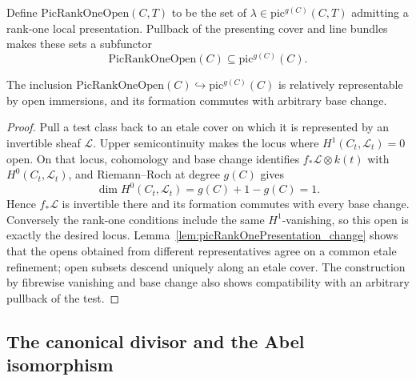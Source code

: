 \begin{definition}
  \label{def:picRankOneOpen}
  \notready
  Define \(\mathrm{PicRankOneOpen}(C,T)\) to be the set of
  \(\lambda\in\mathrm{pic}^{g(C)}(C,T)\) admitting a rank-one local presentation.
  Pullback of the presenting cover and line bundles makes these sets a subfunctor
  \[
    \mathrm{PicRankOneOpen}(C)\subseteq\mathrm{pic}^{g(C)}(C).
  \]
\end{definition}

\begin{theorem}
  \label{thm:picRankOneOpen_isOpen}
  \notready
  The inclusion
  \(\mathrm{PicRankOneOpen}(C)\hookrightarrow\mathrm{pic}^{g(C)}(C)\) is relatively
  representable by open immersions, and its formation commutes with arbitrary base change.
\end{theorem}
\begin{proof}
  Pull a test class back to an etale cover on which it is represented by an invertible sheaf
  \(\mathcal L\).  Upper semicontinuity makes the locus where
  \(H^1(C_t,\mathcal L_t)=0\) open.  On that locus, cohomology and base change identifies
  \(f_*\mathcal L\otimes k(t)\) with \(H^0(C_t,\mathcal L_t)\), and Riemann--Roch at degree
  \(g(C)\) gives
  \[
    \dim H^0(C_t,\mathcal L_t)=g(C)+1-g(C)=1.
  \]
  Hence \(f_*\mathcal L\) is invertible there and its formation commutes with every base
  change.  Conversely the rank-one conditions include the same \(H^1\)-vanishing, so this
  open is exactly the desired locus.  Lemma~\ref{lem:picRankOnePresentation_change} shows
  that the opens obtained from different representatives agree on a common etale refinement;
  open subsets descend uniquely along an etale cover.  The construction by fibrewise
  vanishing and base change also shows compatibility with an arbitrary pullback of the test.
\end{proof}

\subsection{The canonical divisor and the Abel isomorphism}

